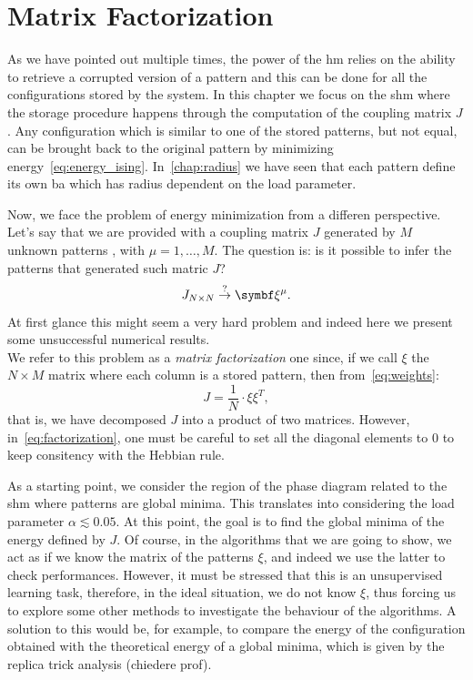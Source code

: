 \documentclass[\rootdir/main.tex]{subfiles}
\begin{document}
\chapter{Matrix Factorization}\label{chap:fact}
As we have pointed out multiple times, the power of the \acrshort{hm} relies on the ability to retrieve a corrupted version of a pattern and this can be done for all the configurations stored by the system. In this chapter we focus on the \acrlong{shm} where the storage procedure happens through the computation of the coupling matrix $J$. Any configuration \bsigma which is similar to one of the stored patterns, but not equal, can be brought back to the original pattern by minimizing energy~\cref{eq:energy_ising}. In~\cref{chap:radius} we have seen that each pattern define its own \acrlong{ba} which has radius dependent on the load parameter.

Now, we face the problem of energy minimization from a differen perspective. Let's say that we are provided with a coupling matrix $J$ generated by $M$ unknown patterns \bxi, with $\mu = 1, \dots, M$. The question is:
is it possible to infer the patterns that generated such matric $J$?
\begin{equation*}
    J_{N \times N} \overset{?}{\rightarrow} \bxi.
\end{equation*}
At first glance this might seem a very hard problem and indeed here we present some unsuccessful numerical results.\\
We refer to this problem as a \emph{matrix factorization} one since, if we call $\xi$ the $N \times M$ matrix where each column is a stored pattern, then from~\cref{eq:weights}:
\begin{equation}\label{eq:factorization}
    J = \frac{1}{N} \cdot \xi \xi^T,
\end{equation}
that is, we have decomposed $J$ into a product of two matrices. However, in~\cref{eq:factorization}, one must be careful to set all the diagonal elements to $0$ to keep consitency with the Hebbian rule.

As a starting point, we consider the region of the phase diagram related to the \acrlong{shm} where patterns are global minima. This translates into considering the load parameter $\alpha \lesssim 0.05$. At this point, the goal is to find the global minima of the energy defined by $J$. Of course, in the algorithms that we are going to show, we act as if we know the matrix of the patterns $\xi$, and indeed we use the latter to check performances. However, it must be stressed that this is an unsupervised learning task, therefore, in the ideal situation, we do not know $\xi$, thus forcing us to explore some other methods to investigate the behaviour of the algorithms. A solution to this would be, for example, to compare the energy of the configuration obtained with the theoretical energy of a global minima, which is given by the replica trick analysis (chiedere prof).
\end{document}
